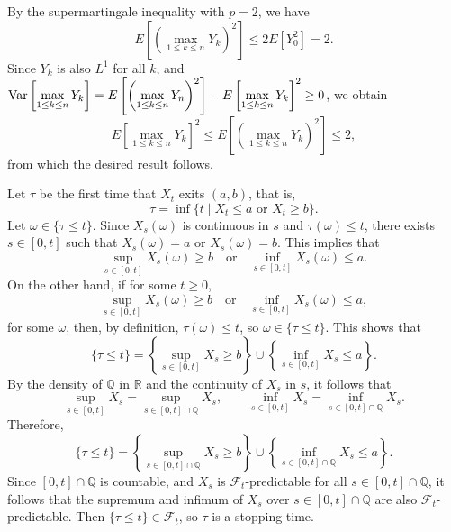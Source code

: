 \documentclass{homework}
\newcommand{\fil}{\mathcal{F}}
\begin{document}
	By the supermartingale inequality with $p=2$, we have
	\begin{equation*}
		E\left[\left(\max_{1\le k\le n}Y_k\right)^2\right] \le 2E[Y_0^2] = 2.
	\end{equation*}
	Since $Y_k$ is also $L^1$ for all $k$, and $\mathrm{Var}\left[\max\limits_{1\le k\le n}Y_k\right] = E\left[\left(\max\limits_{1\le k\le n}Y_n\right)^2\right] - E\left[\max\limits_{1\le k\le n}Y_k\right]^2 \ge 0$, we obtain
	\begin{equation*}
		E\left[\max_{1\le k\le n}Y_k\right]^2 \le E\left[\left(\max_{1\le k\le n}Y_k\right)^2\right] \le2,
	\end{equation*}
	from which the desired result follows.
	
	\question Let $\tau$ be the first time that $X_t$ exits $(a,b)$, that is,
	\begin{equation*}
		\tau = \inf\{t \mid X_t \le a \text{ or } X_t \ge b\}.
	\end{equation*}
	Let $\omega \in \{\tau \le t\}$. Since $X_s(\omega)$ is continuous in $s$ and $\tau(\omega) \le t$, there exists $s \in [0,t]$ such that $X_s(\omega)=a$ or $X_s(\omega) = b$. This implies that
	\begin{equation*}
		\sup_{s\in[0,t]}X_s(\omega) \ge b \quad\text{or}\quad \inf_{s\in[0,t]}X_s(\omega) \le a.
	\end{equation*}
	On the other hand, if for some $t \ge 0$,
	\begin{equation*}
		\sup_{s\in[0,t]}X_s(\omega) \ge b \quad\text{or}\quad \inf_{s\in[0,t]}X_s(\omega) \le a,
	\end{equation*}
	for some $\omega$, then, by definition, $\tau(\omega) \le t$, so $\omega \in \{\tau\le t\}$.
	This shows that
	\begin{equation*}
		\{\tau \le t\} = \left\{\sup_{s\in [0,t]}X_s \ge b\right\} \cup \left\{\inf_{s\in[0,t]}X_s \le a\right\}.
	\end{equation*}
	By the density of $\mathbb{Q}$ in $\mathbb{R}$ and the continuity of $X_s$ in $s$, it follows that
	\begin{equation*}
		\sup_{s\in[0,t]}X_s = \sup_{s\in[0,t]\cap\mathbb{Q}}X_s, \qquad \inf_{s\in[0,t]}X_s = \inf_{s\in[0,t]\cap\mathbb{Q}}X_s.
	\end{equation*}
	Therefore,
	\begin{equation*}
		\{\tau\le t\} = \left\{\sup_{s\in[0,t]\cap\mathbb{Q}} X_s \ge b\right\} \cup \left\{\inf_{s\in[0,t]\cap\mathbb{Q}}X_s \le a\right\}.
	\end{equation*}
	Since $[0,t]\cap\mathbb{Q}$ is countable, and $X_s$ is $\fil_t$-predictable for all $s \in [0,t]\cap\mathbb{Q}$, it follows that the supremum and infimum of $X_s$ over $s\in[0,t]\cap\mathbb{Q}$ are also $\fil_t$-predictable. Then $\{\tau \le t\} \in \fil_t$, so $\tau$ is a stopping time.
	
\end{document}
